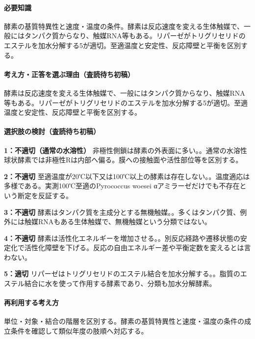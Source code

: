 \paragraph{必要知識} 酵素の基質特異性と速度・温度の条件。酵素は反応速度を変える生体触媒で、一般にはタンパク質からなり、触媒RNA等もある。リパーゼがトリグリセリドのエステルを加水分解する5が適切。至適温度と安定性、反応障壁と平衡を区別する。

\paragraph{考え方・正答を選ぶ理由（査読待ち初稿）} 酵素は反応速度を変える生体触媒で、一般にはタンパク質からなり、触媒RNA等もある。リパーゼがトリグリセリドのエステルを加水分解する5が適切。至適温度と安定性、反応障壁と平衡を区別する。

\paragraph{選択肢の検討（査読待ち初稿）}\mbox{}\par

\noindent\textbf{1：不適切（通常の水溶性）} 非極性側鎖は酵素の外表面に多い。。通常の水溶性球状酵素では非極性Rは内部へ偏る。膜への接触面や活性部位等を区別する。\par

\noindent\textbf{2：不適切} 至適温度が20℃以下又は100℃以上の酵素は存在しない。。温度適応は多様である。実測100℃至適のPyrococcus woesei αアミラーゼだけでも不存在という断定を反証する。\par

\noindent\textbf{3：不適切} 酵素はタンパク質を主成分とする無機触媒。。多くはタンパク質、例外には触媒RNAもある生体触媒で、無機触媒という分類ではない。\par

\noindent\textbf{4：不適切} 酵素は活性化エネルギーを増加させる。。別反応経路や遷移状態の安定化で活性化障壁を下げる。反応の自由エネルギー差や平衡定数を変えるとは言わない。\par

\noindent\textbf{5：適切} リパーゼはトリグリセリドのエステル結合を加水分解する。。脂質のエステル結合に水を使って作用する酵素であり、分類も加水分解酵素。\par

\paragraph{再利用する考え方} 単位・対象・結合の階層を区別する。酵素の基質特異性と速度・温度の条件の成立条件を確認して類似年度の肢順へ対応する。

